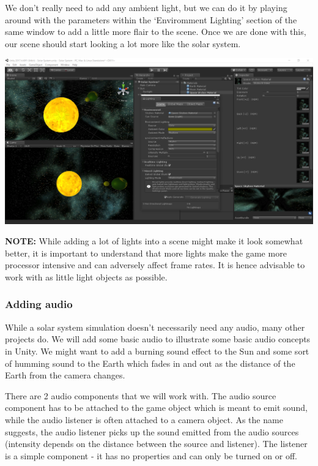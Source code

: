 \documentclass{article}[a4paper,12pt]
\theoremstyle{definition}
\begin{document}
We don't really need to add any ambient light, but we can do it by playing around with the parameters within the `Enviromment Lighting' section of the same window to add a little more flair to the scene. Once we are done with this, our scene should start looking a lot more like the solar system.
\begin{center}\includegraphics[width=\textwidth]{final_lighting.png}\end{center}
\textbf{NOTE:} While adding a lot of lights into a scene might make it look somewhat better, it is important to understand that more lights make the game more processor intensive and can adversely affect frame rates. It is hence advisable to work with as little light objects as possible.
\subsubsection{Adding audio}
While a solar system simulation doesn't necessarily need any audio, many other projects do. We will add some basic audio to illustrate some basic audio concepts in Unity. We might want to add a burning sound effect to the Sun and some sort of humming sound to the Earth which fades in and out as the distance of the Earth from the camera changes.
\vspace{6pt}

There are 2 audio components that we will work with. The audio source component has to be attached to the game object which is meant to emit sound, while the audio listener is often attached to a camera object. As the name suggests, the audio listener picks up the sound emitted from the audio sources (intensity depends on the distance between the source and listener). The listener is a simple component -  it has no properties and can only be turned on or off.
\vspace{6pt}
\end{document}
